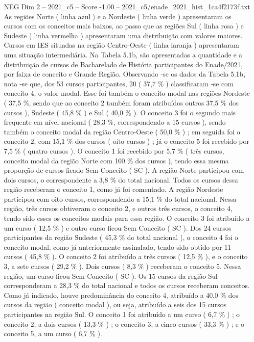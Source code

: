 \begin{textsample}{NEG Dim 2 – 2021\_c5 – Score -1.00 – 2021\_c5/enade\_2021\_hist\_1ca4f2173f.txt}
As regiões Norte ( linha azul ) e a Nordeste ( linha verde ) apresentaram os cursos com os conceitos mais baixos, ao passo que as regiões Sul ( linha rosa ) e Sudeste ( linha vermelha ) apresentaram uma distribuição com valores maiores.
Cursos em IES situadas na região Centro-Oeste ( linha laranja ) apresentaram uma situação intermediária.
Na Tabela 5.1b, são apresentadas a quantidade e a distribuição de cursos de Bacharelado de História participantes do Enade/2021, por faixa de conceito e Grande Região.
Observando -se os dados da Tabela 5.1b, nota -se que, dos 53 cursos participantes, 20 ( 37,7 \% ) classificaram -se com conceito 4, o valor modal.
Esse foi também o conceito modal nas regiões Nordeste ( 37,5 \%, sendo que ao conceito 2 também foram atribuídos outros 37,5 \% dos cursos ), Sudeste ( 45,8 \% ) e Sul ( 40,0 \% ).
O conceito 3 foi o segundo mais frequente em nível nacional ( 28,3 \%, correspondendo a 15 cursos ), sendo também o conceito modal da região Centro-Oeste ( 50,0 \% ) ; em seguida foi o conceito 2, com 15,1 \% dos cursos ( oito cursos ) ; já o conceito 5 foi recebido por 7,5 \% ( quatro cursos ).
O conceito 1 foi recebido por 5,7 \% ( três cursos, conceito modal da região Norte com 100 \% dos cursos ), tendo essa mesma proporção de cursos ficado Sem Conceito ( SC ).
A região Norte participou com dois cursos, o correspondente a 3,8 \% do total nacional.
Todos os cursos dessa região receberam o conceito 1, como já foi comentado.
A região Nordeste participou com oito cursos, correspondendo a 15,1 \% do total nacional.
Nessa região, três cursos obtiveram o conceito 2, e outros três cursos, o conceito 4, tendo sido esses os conceitos modais para essa região.
O conceito 3 foi atribuído a um curso ( 12,5 \% ) e outro curso ficou Sem Conceito ( SC ).
Dos 24 cursos participantes da região Sudeste ( 45,3 \% do total nacional ), o conceito 4 foi o conceito modal, como já anteriormente assinalado, tendo sido obtido por 11 cursos ( 45,8 \% ).
O conceito 2 foi atribuído a três cursos ( 12,5 \% ), e o conceito 3, a sete cursos ( 29,2 \% ).
Dois cursos ( 8,3 \% ) receberam o conceito 5.
Nessa região, um curso ficou Sem Conceito ( SC ).
Os 15 cursos da região Sul corresponderam a 28,3 \% do total nacional e todos os cursos receberam conceitos.
Como já indicado, houve predominância do conceito 4, atribuído a 40,0 \% dos cursos da região ( conceito modal ), ou seja, atribuído a seis dos 15 cursos participantes na região Sul.
O conceito 1 foi atribuído a um curso ( 6,7 \% ) ; o conceito 2, a dois cursos ( 13,3 \% ) ; o conceito 3, a cinco cursos ( 33,3 \% ) ; e o conceito 5, a um curso ( 6,7 \% ).

\end{textsample}
